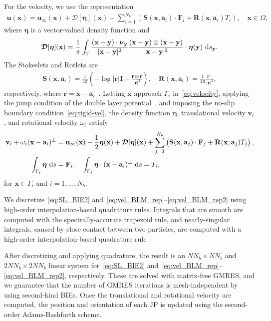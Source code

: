 \documentclass[prb,preprint,showpacs,preprintnumbers,amsmath,amssymb,longbibliography]{revtex4-1}
\renewcommand{\aa}{\mathbf{a}}
\newcommand{\DDD}{\boldsymbol{\mathcal{D}}}
\newcommand{\eeta}{\boldsymbol{\eta}}
\newcommand{\FF}{\mathbf{F}}
\newcommand{\nnu}{\boldsymbol{\nu}}
\newcommand{\rr}{\mathbf{r}}
\newcommand{\RR}{\mathbf{R}}
\renewcommand{\SS}{\mathbf{S}}
\newcommand{\xx}{\mathbf{x}}
\newcommand{\uu}{\mathbf{u}}
\renewcommand{\vv}{\mathbf{v}}
\newcommand{\yy}{\mathbf{y}}
\begin{document}
For the velocity, we use the representation
\begin{align}
  \label{eq:velocity}
  \uu(\xx) = \uu_\infty(\xx) + \DDD[\eeta](\xx) + 
    \sum_{i=1}^{N_b} \left(\SS(\xx,\aa_i) \cdot \FF_i + 
    \RR(\xx,\aa_i) T_i\right), \quad \xx \in \Omega,
\end{align}
where $\eeta$ is a vector-valued density function and
\begin{align}
  \DDD[\eeta](\xx) = \frac{1}{\pi} \int_{\Gamma} 
    \frac{(\xx - \yy) \cdot \nnu_\yy}{|\xx - \yy|^2}
    \frac{(\xx - \yy) \otimes (\xx - \yy)}{|\xx - \yy|^2}
    \cdot \eeta(\yy)\, \dif s_\yy.
\end{align}
The Stokeslets and Rotlets are
\begin{align}
  \SS(\xx,\aa_i) = \frac{1}{4\pi} \left(-\log |\rr|\mathbf{I} +
    \frac{\rr \otimes \rr}{|\rr|^2}\right), \quad 
  \RR(\xx,\aa_i) = \frac{1}{4\pi} \frac{\rr^\perp}{|\rr|^2}, 
\end{align}
respectively, where $\rr = \xx - \aa_i$~\cite{pow-mir1987}. Letting
$\xx$ approach $\Gamma_i$ in~\eqref{eq:velocity}, applying the jump
condition of the double layer potential~\cite{poz1992}, and imposing the
no-slip boundary condition~\eqref{eq:rigid-vel}, the density function
$\eeta$, translational velocity $\vv_i$, and rotational velocity
$\omega_i$ satisfy
\begin{alignat}{3}
  \label{eq:vel_BLM_rep}
  \vv_i + \omega_i (\xx - \aa_i)^\perp &= \uu_\infty(\xx)
    -\frac{1}{2} \eeta(\xx) + \DDD[\eeta](\xx) 
    + \sum_{j=1}^{N_b} 
    \left(\SS(\xx,\aa_j) \cdot \FF_j + \RR(\xx,\aa_j) T_j\right),\\
  \label{eq:vel_BLM_rep2}
  \int_{\Gamma_i} \eeta \, \dif s &= \mathbf{F}_i, \quad
  \int_{\Gamma_i} \eeta \cdot (\xx-\aa_i)^\perp \, \dif s = T_i,
\end{alignat}
for $\xx \in \Gamma_i$ and $i = 1,\ldots,N_b$.

We discretize~\eqref{eq:SL_BIE2}
and~\eqref{eq:vel_BLM_rep}--\eqref{eq:vel_BLM_rep2} using high-order
interpolation-based quadrature rules. Integrals that are smooth are
computed with the spectrally-accurate trapezoid rule, and
nearly-singular integrals, caused by close contact between two
particles, are computed with a high-order interpolation-based quadrature
rule~\cite{qua-bir2014}.

After discretizing and applying quadrature, the result is an $NN_b
\times NN_b$ and $2NN_b \times 2NN_b$ linear system
for~\eqref{eq:SL_BIE2}
and~\eqref{eq:vel_BLM_rep}--\eqref{eq:vel_BLM_rep2}, respectively.
These are solved with matrix-free GMRES, and we guarantee that the
number of GMRES iterations is mesh-independent by using second-kind
BIEs. Once the translational and rotational velocity are computed, the
position and orientation of each JP is updated using the second-order
Adams-Bashforth scheme.
\end{document}
